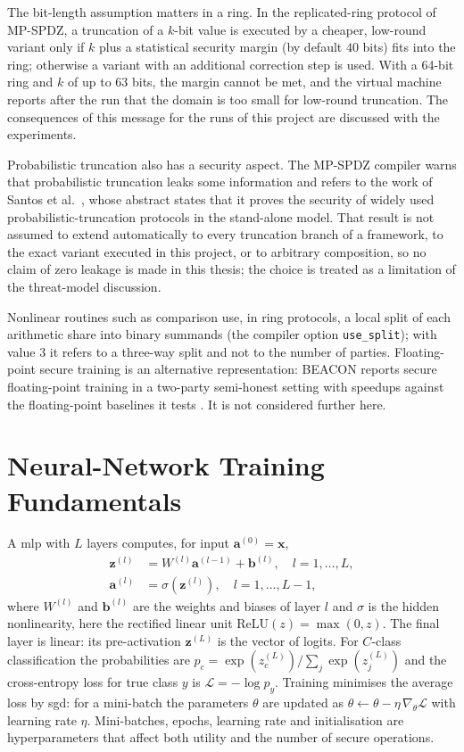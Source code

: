 The bit-length assumption matters in a ring. In the replicated-ring protocol of MP-SPDZ, a truncation of a $k$-bit value is executed by a cheaper, low-round variant only if $k$ plus a statistical security margin (by default $40$ bits) fits into the ring; otherwise a variant with an additional correction step is used. With a 64-bit ring and $k$ of up to $63$ bits, the margin cannot be met, and the virtual machine reports after the run that the domain is too small for low-round truncation. The consequences of this message for the runs of this project are discussed with the experiments.

Probabilistic truncation also has a security aspect. The MP-SPDZ compiler warns that probabilistic truncation leaks some information and refers to the work of Santos et al.\ \cite{santos2024curl}, whose abstract states that it proves the security of widely used probabilistic-truncation protocols in the stand-alone model. That result is not assumed to extend automatically to every truncation branch of a framework, to the exact variant executed in this project, or to arbitrary composition, so no claim of zero leakage is made in this thesis; the choice is treated as a limitation of the threat-model discussion.

Nonlinear routines such as comparison use, in ring protocols, a local split of each arithmetic share into binary summands (the compiler option \texttt{use\_split}); with value $3$ it refers to a three-way split and not to the number of parties. Floating-point secure training is an alternative representation: BEACON reports secure floating-point training in a two-party semi-honest setting with speedups against the floating-point baselines it tests \cite{rathee2023beacon}. It is not considered further here.

\section{Neural-Network Training Fundamentals}\label{sec:bg-nn}
A \ac{mlp} with $L$ layers computes, for input $\mathbf{a}^{(0)}=\mathbf{x}$,
\begin{align}
  \mathbf{z}^{(l)} &= W^{(l)}\mathbf{a}^{(l-1)} + \mathbf{b}^{(l)}, \quad l=1,\dots,L, \label{eq:mlp-pre}\\
  \mathbf{a}^{(l)} &= \sigma\!\left(\mathbf{z}^{(l)}\right), \quad l=1,\dots,L-1, \label{eq:mlp-hidden}
\end{align}
where $W^{(l)}$ and $\mathbf{b}^{(l)}$ are the weights and biases of layer $l$ and $\sigma$ is the hidden nonlinearity, here the rectified linear unit $\mathrm{ReLU}(z)=\max(0,z)$. The final layer is linear: its pre-activation $\mathbf{z}^{(L)}$ is the vector of logits. For $C$-class classification the probabilities are $p_c = \exp(z^{(L)}_c)/\sum_{j}\exp(z^{(L)}_j)$ and the cross-entropy loss for true class $y$ is $\mathcal{L} = -\log p_y$. Training minimises the average loss by \ac{sgd}: for a mini-batch the parameters $\theta$ are updated as $\theta \leftarrow \theta - \eta\,\nabla_\theta \mathcal{L}$ with learning rate $\eta$. Mini-batches, epochs, learning rate and initialisation are hyperparameters that affect both utility and the number of secure operations.

